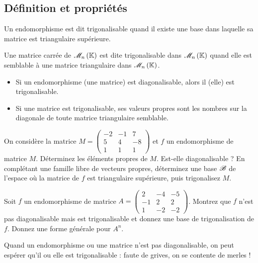 \subsection{Définition et propriétés}

\begin{defi}
Un endomorphisme est dit trigonalisable quand il existe une base dans laquelle sa matrice est triangulaire supérieure.

Une matrice carrée de \(\M{n}\) est dite trigonalisable dans \(\M{n}\) quand elle est semblable à une matrice triangulaire dans \(\M{n}\).
\end{defi}

\begin{rem}
\begin{itemize}
    \item Si un endomorphisme (une matrice) est diagonalisable, alors il (elle) est trigonalisable. \\
    \item Si une matrice est trigonalisable, ses valeurs propres sont les nombres sur la diagonale de toute matrice triangulaire semblable.
\end{itemize}
\end{rem}

\begin{exo}
On considère la matrice \(M=\begin{pmatrix}
-2 & -1 & 7 \\
5 & 4 & -8 \\
1 & 1 & 1
\end{pmatrix}\) et \(f\) un endomorphisme de matrice \(M\). Déterminez les éléments propres de \(M\). Est-elle diagonalisable ? En complétant une famille libre de vecteurs propres, déterminez une base \(\mathscr{B}\) de l'espace où la matrice de \(f\) est triangulaire supérieure, puis trigonalisez \(M\).
\end{exo}

\begin{exo}
Soit \(f\) un endomorphisme de matrice \(A=\begin{pmatrix}
2 & -4 & -5 \\
-1 & 2 & 2 \\
1 & -2 & -2
\end{pmatrix}\). Montrez que \(f\) n'est pas diagonalisable mais est trigonalisable et donnez une base de trigonalisation de \(f\). Donnez une forme générale pour \(A^n\).
\end{exo}

Quand un endomorphisme ou une matrice n'est pas diagonalisable, on peut espérer qu'il ou elle est trigonalisable : faute de grives, on se contente de merles !

